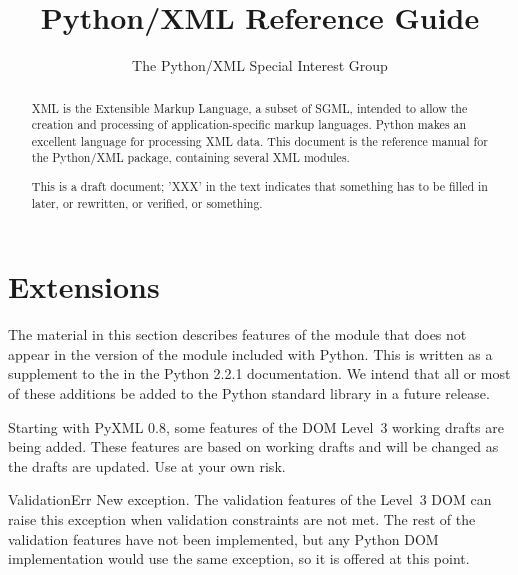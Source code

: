 \documentclass{howto}
\title{Python/XML Reference Guide}
\author{The Python/XML Special Interest Group}
\begin{document}
\maketitle

\begin{abstract}
\noindent
XML is the Extensible Markup Language, a subset of SGML, intended to
allow the creation and processing of application-specific markup
languages.  Python makes an excellent language for processing XML
data.  This document is the reference manual for the Python/XML
package, containing several XML modules.

This is a draft document; 'XXX' in the text indicates that something
has to be filled in later, or rewritten, or verified, or something.  

\end{abstract}

\tableofcontents

\section{ Extensions}


\begin{notice}
  The material in this section describes features of the
   module that does not appear in the version of the
  module included with Python.  This is written as a supplement to the
   in
  the Python 2.2.1 documentation.  We intend that all or most of these
  additions be added to the Python standard library in a future
  release.
\end{notice}

Starting with PyXML 0.8, some features of the DOM Level~3 working
drafts are being added.  These features are based on working drafts
and will be changed as the drafts are updated.  Use at your own risk.

\begin{excdesc}{ValidationErr}
  New exception.  The validation features of the Level~3 DOM can raise
  this exception when validation constraints are not met.  The rest of
  the validation features have not been implemented, but any Python
  DOM implementation would use the same exception, so it is offered at
  this point.
\end{excdesc}
\end{document}
